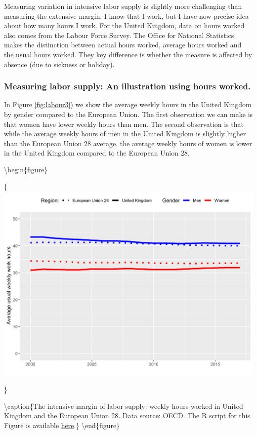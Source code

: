 \documentclass[]{book}
\begin{document}
Measuring variation in intensive labor supply is slightly more challenging than measuring the extensive margin. I know that I work, but I have now precise idea about how many hours I work. For the United Kingdom, data on hours worked also comes from the Labour Force Survey. The Office for National Statistics makes the distinction between actual hours worked, average hours worked and the usual hours worked. They key difference is whether the measure is affected by absence (due to sickness or holiday).

\hypertarget{measuring-labor-supply-an-illustration-using-hours-worked.}{%
\subsubsection{Measuring labor supply: An illustration using hours worked.}\label{measuring-labor-supply-an-illustration-using-hours-worked.}}

In Figure \ref{fig:labour3}) we show the average weekly hours in the United Kingdom by gender compared to the European Union. The first observation we can make is that women have lower weekly hours than men. The second observation is that while the average weekly hours of men in the United Kingdom is slightly higher than the European Union 28 average, the average weekly hours of women is lower in the United Kingdom compared to the European Union 28.

\textbackslash begin\{figure\}

\{\centering \includegraphics[width=0.89\linewidth]{_resources/chapter_labour/fig17}

\}

\textbackslash caption\{The intensive margin of labor supply: weekly hours worked in United Kingdom and the European Union 28. Data source: OECD. The R script for this Figure is available \href{https://www.hhsievertsen.net/economicdata/notes/lecture12/rmaterial/lecnote_12_script_for_fig9.R}{here}.\}\label{fig:labour3}
\textbackslash end\{figure\}
\end{document}
